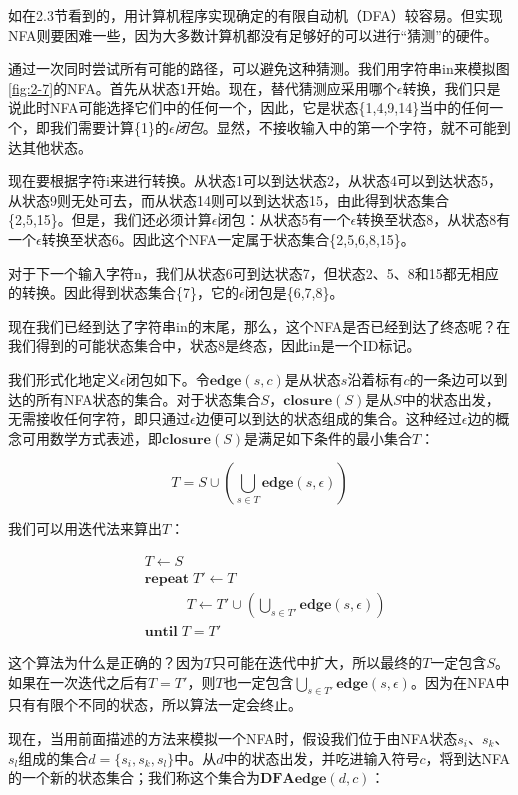 \documentclass[cn,11pt,chinese]{elegantbook}
\begin{document}
如在2.3节看到的，用计算机程序实现确定的有限自动机（DFA）较容易。但实现NFA则要困难一些，因为大多数计算机都没有足够好的可以进行“猜测”的硬件。

通过一次同时尝试所有可能的路径，可以避免这种猜测。我们用字符串in来模拟图\ref{fig:2-7}的NFA。首先从状态1开始。现在，替代猜测应采用哪个$\epsilon$转换，我们只是说此时NFA可能选择它们中的任何一个，因此，它是状态\{1,4,9,14\}当中的任何一个，即我们需要计算\{1\}的$\epsilon$\textit{闭包}。显然，不接收输入中的第一个字符，就不可能到达其他状态。

现在要根据字符i来进行转换。从状态1可以到达状态2，从状态4可以到达状态5，从状态9则无处可去，而从状态14则可以到达状态15，由此得到状态集合\{2,5,15\}。但是，我们还必须计算$\epsilon$闭包：从状态5有一个$\epsilon$转换至状态8，从状态8有一个$\epsilon$转换至状态6。因此这个NFA一定属于状态集合\{2,5,6,8,15\}。

对于下一个输入字符n，我们从状态6可到达状态7，但状态2、5、8和15都无相应的转换。因此得到状态集合\{7\}，它的$\epsilon$闭包是\{6,7,8\}。

现在我们已经到达了字符串in的末尾，那么，这个NFA是否已经到达了终态呢？在我们得到的可能状态集合中，状态8是终态，因此in是一个ID标记。

我们形式化地定义$\epsilon$闭包如下。令$\textbf{edge}(s,c)$是从状态$s$沿着标有$c$的一条边可以到达的所有NFA状态的集合。对于状态集合$S$，$\textbf{closure}(S)$是从$S$中的状态出发，无需接收任何字符，即只通过$\epsilon$边便可以到达的状态组成的集合。这种经过$\epsilon$边的概念可用数学方式表述，即$\textbf{closure}(S)$是满足如下条件的最小集合$T$：

$$
T = S \cup (\bigcup_{s \in T} \textbf{edge}(s,\epsilon))
$$

我们可以用迭代法来算出$T$：

\begin{align*}
& T \leftarrow S \\
& \textbf{repeat} \; T' \leftarrow T \\
&    \quad\quad\quad T  \leftarrow T' \cup (\bigcup_{s \in T'} \textbf{edge}(s,\epsilon)) \\
& \textbf{until} \; T = T'
\end{align*}

这个算法为什么是正确的？因为$T$只可能在迭代中扩大，所以最终的$T$一定包含$S$。如果在一次迭代之后有$T=T'$，则$T$也一定包含$\bigcup_{s \in T'} \textbf{edge}(s,\epsilon)$。因为在NFA中只有有限个不同的状态，所以算法一定会终止。

现在，当用前面描述的方法来模拟一个NFA时，假设我们位于由NFA状态$s_i$、$s_k$、$s_l$组成的集合$d=\{s_i,s_k,s_l\}$中。从$d$中的状态出发，并吃进输入符号$c$，将到达NFA的一个新的状态集合；我们称这个集合为$\textbf{DFAedge}(d,c)$：
\end{document}
